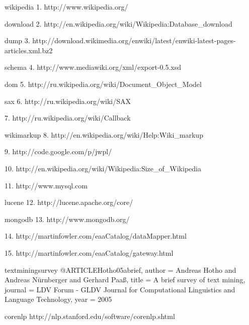 
wikipedia
1. http://www.wikipedia.org/

download
2. http://en.wikipedia.org/wiki/Wikipedia:Database_download

dump
3. http://download.wikimedia.org/enwiki/latest/enwiki-latest-pages-articles.xml.bz2

schema
4. http://www.mediawiki.org/xml/export-0.5.xsd

dom
5. http://ru.wikipedia.org/wiki/Document_Object_Model

sax
6. http://ru.wikipedia.org/wiki/SAX

7. http://ru.wikipedia.org/wiki/Callback

wikimarkup
8. http://en.wikipedia.org/wiki/Help:Wiki_markup

9. http://code.google.com/p/jwpl/

10. http://en.wikipedia.org/wiki/Wikipedia:Size_of_Wikipedia

11. http://www.mysql.com

lucene
12. http://lucene.apache.org/core/

mongodb
13. http://www.mongodb.org/

14. http://martinfowler.com/eaaCatalog/dataMapper.html

15. http://martinfowler.com/eaaCatalog/gateway.html

textminingsurvey
@ARTICLE{Hotho05abrief,
    author = {Andreas Hotho and Andreas Nürnberger and Gerhard Paaß},
    title = {A brief survey of text mining},
    journal = {LDV Forum - GLDV Journal for Computational Linguistics and Language Technology},
    year = {2005}
}

corenlp
http://nlp.stanford.edu/software/corenlp.shtml

